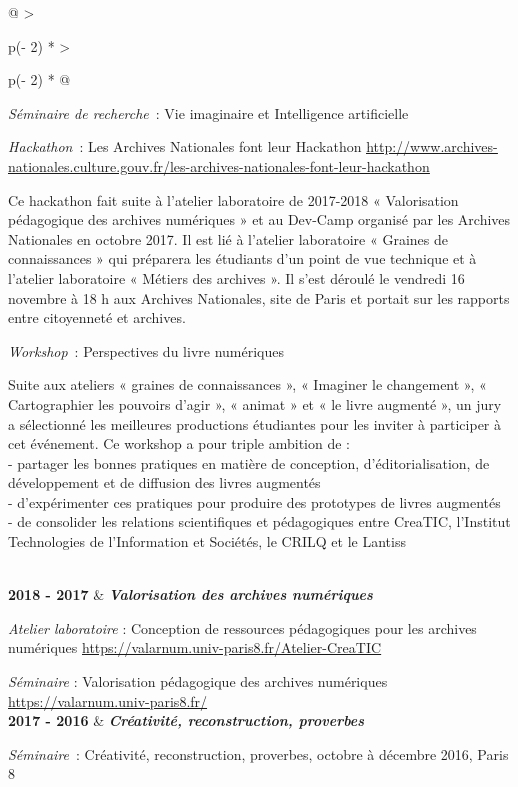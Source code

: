 \documentclass[
  a4paper,
  DIV=11,
  numbers=noendperiod]{scrreprt}
\begin{document}
\begin{longtable}[]{@{}
  >{\raggedright\arraybackslash}p{(\columnwidth - 2\tabcolsep) * }
  >{\raggedright\arraybackslash}p{(\columnwidth - 2\tabcolsep) * }@{}}
\begin{minipage}[t]{\linewidth}
\emph{Séminaire de recherche}~: Vie imaginaire et Intelligence
artificielle

\emph{Hackathon}~: Les Archives Nationales font leur Hackathon
\href{http://www.archives-nationales.culture.gouv.fr/les-archives-nationales-font-leur-hackathon}{\ul{http://www.archives-nationales.culture.gouv.fr/les-archives-nationales-font-leur-hackathon}}

Ce hackathon fait suite à l'atelier laboratoire de 2017-2018 «
Valorisation pédagogique des archives numériques » et au Dev-Camp
organisé par les Archives Nationales en octobre 2017. Il est lié à
l'atelier laboratoire « Graines de connaissances » qui préparera les
étudiants d'un point de vue technique et à l'atelier laboratoire «
Métiers des archives ». Il s'est déroulé le vendredi 16 novembre à 18 h
aux Archives Nationales, site de Paris et portait sur les rapports entre
citoyenneté et archives.

\emph{Workshop}~: Perspectives du livre numériques

Suite aux ateliers « graines de connaissances », « Imaginer le
changement », « Cartographier les pouvoirs d'agir », « animat » et « le
livre augmenté », un jury a sélectionné les meilleures productions
étudiantes pour les inviter à participer à cet événement. Ce workshop a
pour triple ambition de :\\
- partager les bonnes pratiques en matière de conception,
d'éditorialisation, de développement et de diffusion des livres
augmentés\\
- d'expérimenter ces pratiques pour produire des prototypes de livres
augmentés\\
- de consolider les relations scientifiques et pédagogiques entre
CreaTIC, l'Institut Technologies de l'Information et Sociétés, le CRILQ
et le Lantiss\strut
\end{minipage} \\
\textbf{2018 - 2017} & \textbf{\emph{Valorisation des archives
numériques}}

\emph{Atelier laboratoire} : Conception de ressources pédagogiques pour
les archives numériques
\href{https://valarnum.univ-paris8.fr/Atelier-CreaTIC}{\ul{https://valarnum.univ-paris8.fr/Atelier-CreaTIC}}

\emph{Séminaire} : Valorisation pédagogique des archives numériques
\url{https://valarnum.univ-paris8.fr/} \\
\textbf{2017 - 2016} & \textbf{\emph{Créativité, reconstruction,
proverbes}}

\emph{Séminaire}~: Créativité, reconstruction, proverbes, octobre à
décembre 2016, Paris 8


\end{longtable}
\end{document}
